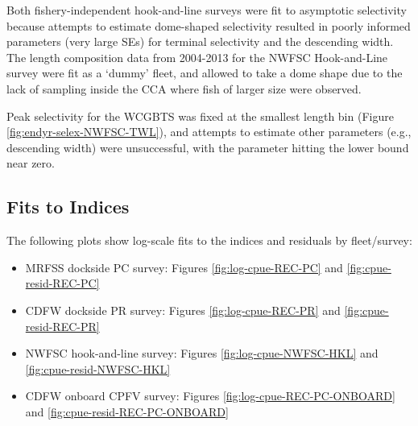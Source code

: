 \documentclass[11pt,
  english,
]{article}
\begin{document}
Both fishery-independent hook-and-line surveys were fit to asymptotic selectivity because attempts to estimate dome-shaped selectivity resulted in poorly informed parameters (very large SEs) for terminal selectivity and the descending width. The length composition data from 2004-2013 for the NWFSC Hook-and-Line survey were fit as a `dummy' fleet, and allowed to take a dome shape due to the lack of sampling inside the CCA where fish of larger size were observed.

Peak selectivity for the WCGBTS was fixed at the smallest length bin (Figure \ref{fig:endyr-selex-NWFSC-TWL}), and attempts to estimate other parameters (e.g., descending width) were unsuccessful, with the parameter hitting the lower bound near zero.


\hypertarget{fits-to-indices}{%
\subsection{Fits to Indices}\label{fits-to-indices}}

\leavevmode\tagmcend\tagstructend

The following plots show log-scale fits to the indices and residuals by fleet/survey:


\begin{itemize}
\item

  MRFSS dockside PC survey: Figures \ref{fig:log-cpue-REC-PC} and \ref{fig:cpue-resid-REC-PC}

  \tagmcend\tagstructend\tagstructend
\item

  CDFW dockside PR survey: Figures \ref{fig:log-cpue-REC-PR} and \ref{fig:cpue-resid-REC-PR}

  \tagmcend\tagstructend\tagstructend
\item

  NWFSC hook-and-line survey: Figures \ref{fig:log-cpue-NWFSC-HKL} and \ref{fig:cpue-resid-NWFSC-HKL}

  \tagmcend\tagstructend\tagstructend
\item

  CDFW onboard CPFV survey: Figures \ref{fig:log-cpue-REC-PC-ONBOARD} and \ref{fig:cpue-resid-REC-PC-ONBOARD}

  \tagmcend\tagstructend\tagstructend
\end{itemize}
\end{document}
